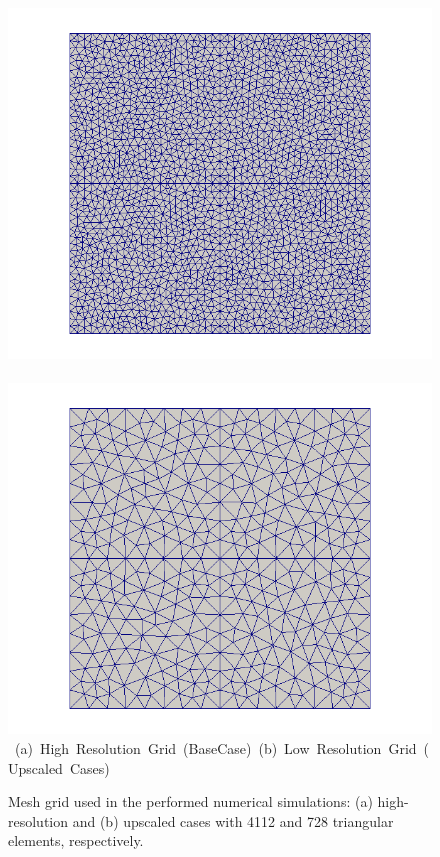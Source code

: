 \begin{figure}[ht] 
\vbox{\vspace{-1cm}
\hbox{\includegraphics[width=.56\textwidth]{./Pics/BaseCase/BaseCase_MeshOnly.png}
      \includegraphics[width=.56\textwidth]{./Pics/ArithMeanCase/ArithMeanCase_MeshOnly.png}}
\vspace{0.cm}
\hbox{\hspace{0.25cm} (a) High Resolution Grid (BaseCase) \hspace{0.75cm} (b) Low Resolution Grid (Upscaled Cases) \hspace{3.0cm}}
\vspace{0.5cm}
}   
\caption{Mesh grid used in the performed numerical simulations: (a) high-resolution and (b) upscaled cases with 4112 and 728 triangular elements, respectively.}
\label{fig:HiRes_LowRes_Mesh}
\end{figure}
\clearpage


